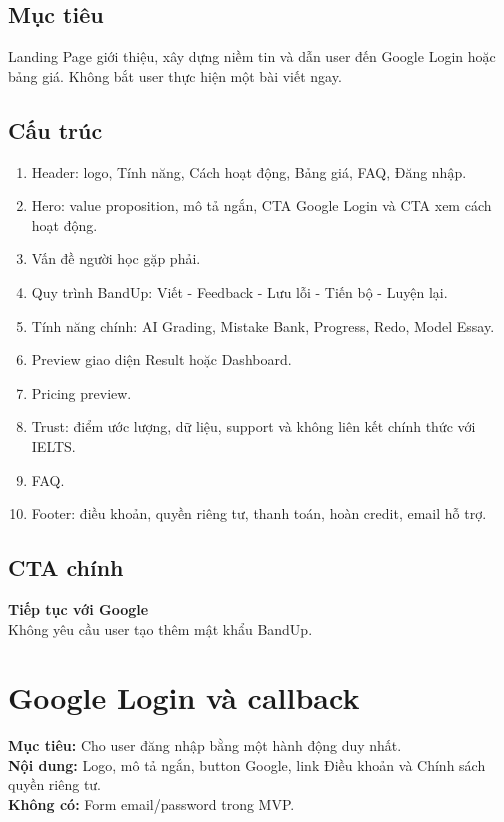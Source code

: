 \documentclass[11pt,a4paper]{article}
\begin{document}
\subsection{Mục tiêu}
Landing Page giới thiệu, xây dựng niềm tin và dẫn user đến Google Login hoặc bảng giá. Không bắt user thực hiện một bài viết ngay.

\subsection{Cấu trúc}
\begin{enumerate}
  \item Header: logo, Tính năng, Cách hoạt động, Bảng giá, FAQ, Đăng nhập.
  \item Hero: value proposition, mô tả ngắn, CTA Google Login và CTA xem cách hoạt động.
  \item Vấn đề người học gặp phải.
  \item Quy trình BandUp: Viết - Feedback - Lưu lỗi - Tiến bộ - Luyện lại.
  \item Tính năng chính: AI Grading, Mistake Bank, Progress, Redo, Model Essay.
  \item Preview giao diện Result hoặc Dashboard.
  \item Pricing preview.
  \item Trust: điểm ước lượng, dữ liệu, support và không liên kết chính thức với IELTS.
  \item FAQ.
  \item Footer: điều khoản, quyền riêng tư, thanh toán, hoàn credit, email hỗ trợ.
\end{enumerate}

\subsection{CTA chính}
\begin{copybox}
\textbf{Tiếp tục với Google}\\
Không yêu cầu user tạo thêm mật khẩu BandUp.
\end{copybox}

\section{Google Login và callback}

\begin{screenbox}
\textbf{Mục tiêu:} Cho user đăng nhập bằng một hành động duy nhất.\\
\textbf{Nội dung:} Logo, mô tả ngắn, button Google, link Điều khoản và Chính sách quyền riêng tư.\\
\textbf{Không có:} Form email/password trong MVP.
\end{screenbox}
\end{document}
